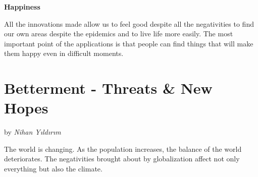 \documentclass[]{book}
\begin{document}
\textbf{Happiness}

All the innovations made allow us to feel good despite all the negativities to find our own areas despite the epidemics and to live life more easily. The most important point of the applications is that people can find things that will make them happy even in difficult moments.

\hypertarget{betterment---threats-new-hopes}{%
\chapter{Betterment - Threats \& New Hopes}\label{betterment---threats-new-hopes}}

by \emph{Nihan Yıldırım}

The world is changing. As the population increases, the balance of the world deteriorates. The negativities brought about by globalization affect not only everything but also the climate.
\end{document}

